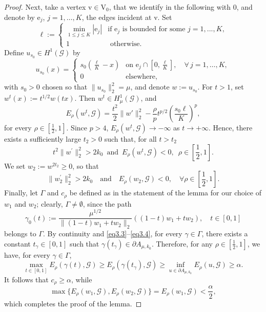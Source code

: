 \documentclass[11pt]{amsart}
\newcommand{\norm}[1]{\lVert#1\rVert}
\newcommand{\V}{\mathrm{V}}
\newcommand{\e}{\mathrm{e}}
\newcommand{\vv}{\mathrm{v}}
\numberwithin{equation}{section}
\begin{document}
\begin{proof}
Next, take a vertex \(\vv \in \V_0\), that we identify in the following with $0$, and denote by \(\e_j\), \(j = 1, \ldots, K\), the edges incident at \(\vv\). Set
\begin{equation*}
\ell :=\begin{cases}
    \min_{1 \leq j \leq K} |\e_j|&\text{if }\e_j \text{ is bounded for some }j = 1, ..., K,\\
    1\quad &\text{ otherwise}.
\end{cases} 
\end{equation*}
Define \(u_{s_{0}}\in H^1(\mathcal{G})\) by
$$
	u_{s_0}(x) = 
	\begin{cases} 
		s_0(\frac{\ell}{K} - x) & \text{on }  \e_j \cap [0,\frac{\ell}{K}], \quad \forall \, j = 1, \ldots, K,\\
		0 & \text{elsewhere,}
	\end{cases}
$$
with $s_0>0$ chosen so that \(\|u_{s_{0}}\|_2^{2}=\mu\), and denote  $w:=u_{s_{0}}$. For \(t>1\), set \(w^t(x):=t^{1/2}w(tx)\). Then \(w^t\in H^1_\mu(\mathcal{G})\), and
\[
E_{\rho}(w^{t},\mathcal{G})= \frac{t^2}{2}\norm{w'}^2_2-\frac{\rho}{p} t^{p/2} \left ( \frac{s_0\ell}{K}  \right )^{p},
\]
for every \(\rho\in[\frac{1}{2},1]\). Since \(p>4\), $E_{\rho}(w^{t},\mathcal{G})\rightarrow -\infty$ as \(t\to+\infty\). Hence,  there exists a sufficiently large \(t_2>0\) such that,  for all \(t>t_{2}\) 
$$t^{2}\|w^{\prime}\|_2^2>2k_{0} \,\,\, \text{and}\,\,\,E_{\rho}(w^{t},\mathcal{G})<0,\,\,\,\rho\in[\frac{1}{2},1].$$
 We set \(w_{2}:=w^{2t_{2}}\geq 0 \), so that
\begin{equation}\label{eq3.4}
\|w_{2}^{\prime}\|_2^2>2k_{0}\quad\text{and}\quad E_{\rho}(w_{2},\mathcal{G})<0,\quad\forall\rho\in\left[\frac{1}{2},1\right].
\end{equation}
Finally, let \(\Gamma\) and \(c_{\rho}\) be defined as in the statement of the lemma for our choice of \(w_{1}\) and \(w_{2}\); clearly, \(\Gamma\neq \emptyset\), since the path
\[
\gamma_{0}(t):=\frac{\mu^{1/2}}{\|(1-t)w_{1}+tw_{2}\|_2}\left((1-t)w_{1}+tw_{2}\right),\quad  t\in[0,1]
\]
belongs to \(\Gamma\). By continuity and \eqref{eq3.3}--\eqref{eq3.4}, for every \(\gamma \in \Gamma\), there exists a constant \(t_\gamma \in [0,1]\) such that \(\gamma(t_\gamma) \in \partial A_{\mu,k_0}\). Therefore, for any \(\rho \in [\frac{1}{2},1]\), we have, for every \(\gamma \in \Gamma\),
\[
\max_{t \in [0,1]} E_\rho(\gamma(t),\mathcal{G}) \geq E_\rho(\gamma(t_\gamma),\mathcal{G}) \geq \inf_{u \in \partial A_{\mu,k_0}} E_\rho(u,\mathcal{G}) \geq \alpha.
\]
It follows that \(c_\rho \geq \alpha\),  while
\[
\max\{E_\rho(w_1,\mathcal{G}),E_\rho(w_2,\mathcal{G})\} = E_\rho(w_1,\mathcal{G}) < \frac{\alpha}{2},
\]
which completes the proof of the lemma.
\end{proof}
\end{document}
